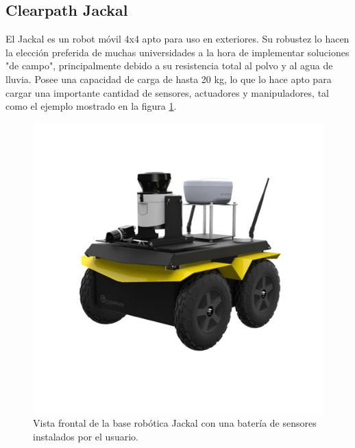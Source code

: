 
\subsection{Clearpath Jackal}

El Jackal es un robot móvil 4x4 apto para uso en exteriores. Su robustez lo hacen la elección preferida de muchas universidades a la hora de implementar soluciones "de campo", principalmente debido a su resistencia total al polvo y al agua de lluvia.\newline
Posee una capacidad de carga de hasta 20 kg, lo que lo hace apto para cargar una importante cantidad de sensores, actuadores y manipuladores, tal como el ejemplo mostrado en la figura \ref{fig:robotJackal}.

\begin{figure}[ht]
	\centering
	\includegraphics[scale=1.6]{./Figures/jackal.png}
	\caption{Vista frontal de la base robótica Jackal con una batería de sensores instalados por el usuario.\protect\footnotemark}
	\label{fig:robotJackal}
\end{figure}


